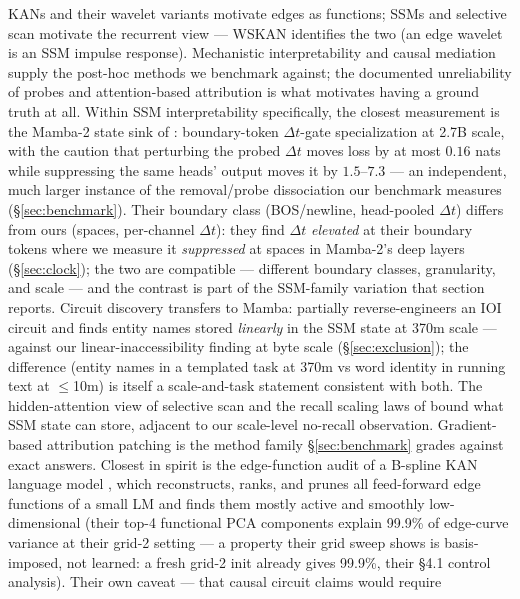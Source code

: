 \documentclass[11pt]{article}
\newcommand{\wskan}{WSKAN}
\newcommand{\Dt}{\Delta t}
\begin{document}
KANs \cite{kan} and their wavelet variants \cite{wavkan} motivate edges as
functions; SSMs and selective scan \cite{s4,mamba,ssd} motivate the
recurrent view --- \wskan{} identifies the two (an edge wavelet is an SSM
impulse response). Mechanistic interpretability \cite{clark2019} and
causal mediation \cite{rome} supply the post-hoc methods we benchmark
against; the documented unreliability of probes and attention-based
attribution \cite{hewitt-liang,jain-wallace} is what motivates having a
ground truth at all.
Within SSM interpretability specifically, the closest measurement is the
Mamba-2 state sink of \cite{mamba-sink}: boundary-token $\Dt$-gate
specialization at 2.7B scale, with the caution that perturbing the probed
$\Dt$ moves loss by at most $0.16$ nats while suppressing the same heads'
output moves it by $1.5$--$7.3$ --- an independent, much larger instance
of the removal/probe dissociation our benchmark measures
(\S\ref{sec:benchmark}). Their boundary class (BOS/newline, head-pooled
$\Dt$) differs from ours (spaces, per-channel $\Dt$): they find $\Dt$
\emph{elevated} at their boundary tokens where we measure it
\emph{suppressed} at spaces in Mamba-2's deep layers
(\S\ref{sec:clock}); the two are compatible --- different boundary
classes, granularity, and scale --- and the contrast is part of the
SSM-family variation that section reports. Circuit discovery transfers to
Mamba: \cite{ioi-mamba} partially reverse-engineers an IOI circuit and
finds entity names stored \emph{linearly} in the SSM state at 370m scale
--- against our linear-inaccessibility finding at byte scale
(\S\ref{sec:exclusion}); the difference (entity names in a templated task
at 370m vs word identity in running text at $\le$10m) is itself a
scale-and-task statement consistent with both. The hidden-attention view
of selective scan \cite{hidden-mamba} and the recall scaling laws of
\cite{mamba-recall} bound what SSM state can store, adjacent to our
scale-level no-recall observation. Gradient-based attribution patching
\cite{eap} is the method family \S\ref{sec:benchmark} grades against exact
answers.
Closest in spirit is the edge-function audit of a
B-spline KAN language model \cite{kan-lm-audit}, which reconstructs,
ranks, and prunes all feed-forward edge functions of a small LM and finds
them mostly active and smoothly low-dimensional (their top-4 functional
PCA components explain 99.9\% of edge-curve variance at their grid-2
setting --- a property their grid sweep shows is basis-imposed, not
learned: a fresh grid-2 init already gives 99.9\%, their \S4.1 control
analysis). Their own caveat --- that causal circuit claims would require
\end{document}
